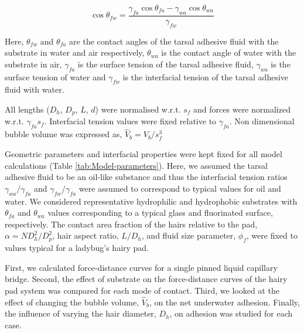 \documentclass[vruler,JEB]{COB}%
\begin{document}
\begin{equation}
\cos\theta_{fw}=\frac{\gamma_{fa}\cos\theta_{fa}-\gamma_{wa}\cos\theta_{wa}}{\gamma_{fw}}\label{eq:theta_fw}
\end{equation}

Here, $\theta_{fw}$ and $\theta_{fa}$ are the contact angles of
the tarsal adhesive fluid with the substrate in water and air respectively,
$\theta_{wa}$ is the contact angle of water with the substrate in
air, $\gamma_{fa}$ is the surface tension of the tarsal adhesive fluid,
$\gamma_{wa}$ is the surface tension of water and $\gamma_{fw}$
is the interfacial tension of the tarsal adhesive fluid with water.

All lengths ($D_{h}$, $D_{p}$, $L$, $d$) were normalised w.r.t. $s_{f}$ and forces were normalized
w.r.t. $\gamma_{fa}s_{f}$. Interfacial tension values were fixed relative
to $\gamma_{fa}$. Non dimensional bubble volume was expressed as,
$\hat{V}_{b}=V_{b}/s_{f}^{3}$

Geometric parameters and interfacial properties were kept fixed for
all model calculations (Table \ref{tab:Model-parameters}). Here,
we assumed the tarsal adhesive fluid to be an oil-like substance and thus the
interfacial tension ratios $\gamma_{wa}/\gamma_{fa}$ and $\gamma_{fw}/\gamma_{fa}$
were assumed to correspond to typical values for oil and water. We considered
representative hydrophilic and hydrophobic substrates with $\theta_{fa}$
and $\theta_{wa}$ values corresponding to a typical glass and fluorinated
surface, respectively. The contact area fraction of the hairs relative to the
pad, $\alpha=ND_{h}^{2}/D_{p}^{2}$, hair aspect ratio, $L/D_{h}$,
and fluid size parameter, $\phi_{f}$, were fixed to values typical
for a ladybug's hairy pad. 

First, we calculated force-distance curves for a single pinned liquid
capillary bridge. Second, the effect of substrate on the force-distance
curves of the hairy pad system was compared for each mode of contact.
Third, we looked at the effect of changing the bubble
volume, $\hat{V}_{b}$, on the net underwater adhesion.
Finally, the influence of varying the hair diameter, $D_{h}$, on adhesion
was studied for each case.
\end{document}
